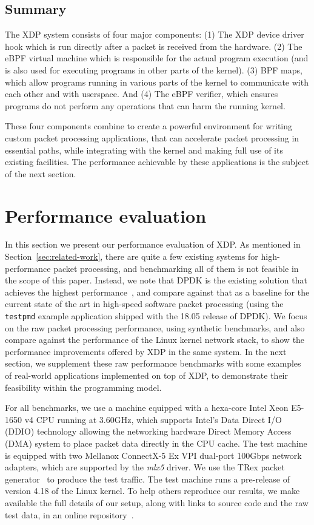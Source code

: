 \documentclass[sigconf]{acmart}
\begin{document}
\subsection{Summary}
\label{sec:design-summary}

The XDP system consists of four major components: (1) The XDP device driver hook
which is run directly after a packet is received from the hardware. (2) The eBPF
virtual machine which is responsible for the actual program execution (and is
also used for executing programs in other parts of the kernel). (3) BPF maps,
which allow programs running in various parts of the kernel to communicate with
each other and with userspace. And (4) The eBPF verifier, which ensures programs
do not perform any operations that can harm the running kernel.

These four components combine to create a powerful environment for writing
custom packet processing applications, that can accelerate packet processing in
essential paths, while integrating with the kernel and making full use of its
existing facilities. The performance achievable by these applications is the
subject of the next section.

\section{Performance evaluation}
\label{sec:perf-eval}
In this section we present our performance evaluation of XDP. As mentioned in
Section~\ref{sec:related-work}, there are quite a few existing systems for
high-performance packet processing, and benchmarking all of them is not feasible
in the scope of this paper. Instead, we note that DPDK is the existing solution
that achieves the highest performance~\cite{gallenmuller_comparison_2015}, and
compare against that as a baseline for the current state of the art in
high-speed software packet processing (using the \texttt{testpmd} example
application shipped with the 18.05 release of DPDK). We focus on the raw packet
processing performance, using synthetic benchmarks, and also compare against the
performance of the Linux kernel network stack, to show the performance
improvements offered by XDP in the same system. In the next section, we
supplement these raw performance benchmarks with some examples of real-world
applications implemented on top of XDP, to demonstrate their feasibility within
the programming model.

For all benchmarks, we use a machine equipped with a hexa-core Intel Xeon
E5-1650 v4 CPU running at 3.60GHz, which supports Intel's Data Direct I/O (DDIO)
technology allowing the networking hardware Direct Memory Access (DMA) system to
place packet data directly in the CPU cache. The test machine is equipped with
two Mellanox ConnectX-5 Ex VPI dual-port 100Gbps network adapters, which are
supported by the \emph{mlx5} driver. We use the TRex packet
generator~\cite{cisco18:_trex_traff_gener} to produce the test traffic. The test
machine runs a pre-release of version 4.18 of the Linux kernel. To help others
reproduce our results, we make available the full details of our setup, along
with links to source code and the raw test data, in an online
repository~\cite{test-data}.
\end{document}

